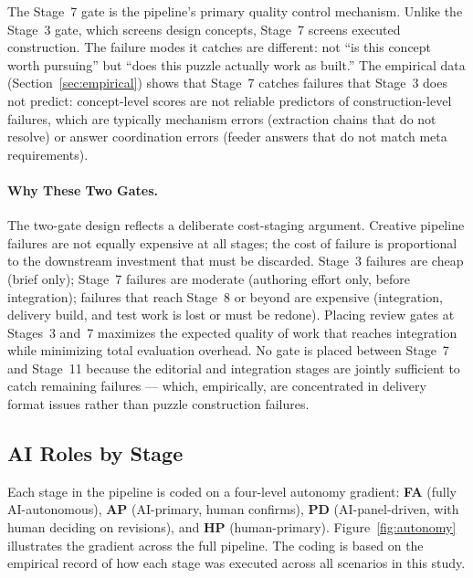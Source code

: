 The Stage~7 gate is the pipeline's primary quality control mechanism. Unlike the Stage~3
gate, which screens design concepts, Stage~7 screens executed construction. The failure
modes it catches are different: not ``is this concept worth pursuing'' but ``does this
puzzle actually work as built.'' The empirical data (Section~\ref{sec:empirical}) shows
that Stage~7 catches failures that Stage~3 does not predict: concept-level scores are
not reliable predictors of construction-level failures, which are typically mechanism
errors (extraction chains that do not resolve) or answer coordination errors (feeder
answers that do not match meta requirements).

\paragraph{Why These Two Gates.}

The two-gate design reflects a deliberate cost-staging argument. Creative pipeline failures
are not equally expensive at all stages; the cost of failure is proportional to the
downstream investment that must be discarded. Stage~3 failures are cheap (brief only);
Stage~7 failures are moderate (authoring effort only, before integration); failures that
reach Stage~8 or beyond are expensive (integration, delivery build, and test work is lost
or must be redone). Placing review gates at Stages~3 and~7 maximizes the expected quality
of work that reaches integration while minimizing total evaluation overhead. No gate is
placed between Stage~7 and Stage~11 because the editorial and integration stages are
jointly sufficient to catch remaining failures --- which, empirically, are concentrated
in delivery format issues rather than puzzle construction failures.

\subsection{AI Roles by Stage}
\label{sec:ai-roles}

Each stage in the pipeline is coded on a four-level autonomy gradient: \textbf{FA} (fully
AI-autonomous), \textbf{AP} (AI-primary, human confirms), \textbf{PD}
(AI-panel-driven, with human deciding on revisions), and \textbf{HP} (human-primary).
Figure~\ref{fig:autonomy} illustrates the gradient across the full pipeline. The coding
is based on the empirical record of how each stage was executed across all scenarios
in this study.

